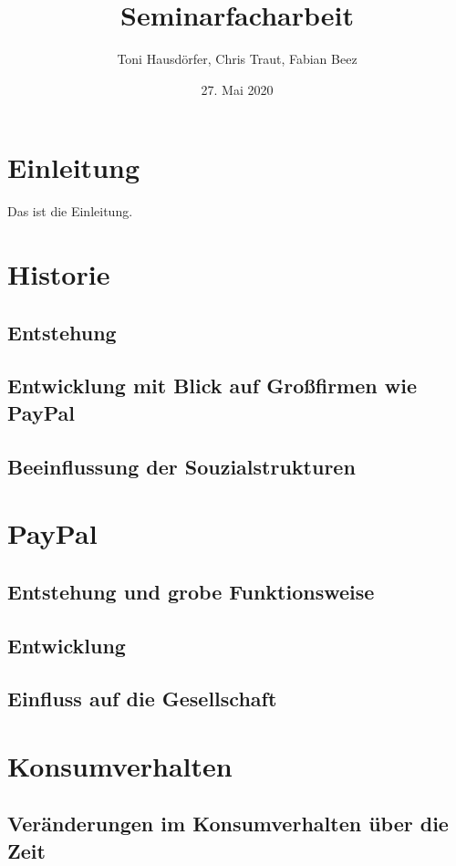 \documentclass[a4paper, 10pt]{scrartcl}
\title{Seminarfacharbeit}
\author{Toni Hausdörfer, Chris Traut, Fabian Beez}
\date{27. Mai 2020}
\begin{document}
    
    \maketitle \newpage
    \tableofcontents \newpage

    \section{Einleitung}
    Das ist die Einleitung.\newpage
    
    \section{Historie}
        \subsection{Entstehung}
        \subsection{Entwicklung mit Blick auf Großfirmen wie PayPal}
        \subsection{Beeinflussung der Souzialstrukturen}
        
    \section{PayPal}
        \subsection{Entstehung und grobe Funktionsweise}
        \subsection{Entwicklung}
        \subsection{Einfluss auf die Gesellschaft}
        
    \section{Konsumverhalten}
        \subsection{Veränderungen im Konsumverhalten über die Zeit}
            
            
\end{document}
